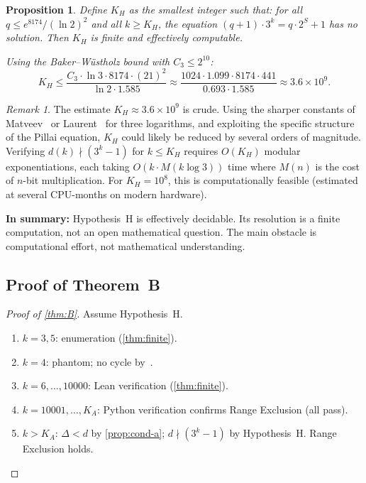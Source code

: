 \documentclass[11pt, a4paper]{amsart}
\theoremstyle{plain}
\newtheorem{proposition}[theorem]{Proposition}
\theoremstyle{definition}
\theoremstyle{remark}
\newtheorem{remark}[theorem]{Remark}
\begin{document}
\begin{proposition}\label{prop:KH}
  Define $K_H$ as the smallest integer such that: for all
  $q \leq e^{8174}/(\ln 2)^2$ and all $k \geq K_H$,
  the equation $(q+1) \cdot 3^k = q \cdot 2^S + 1$ has
  no solution.  Then $K_H$ is finite and effectively computable.

  Using the Baker--W\"ustholz bound with $C_3 \leq 2^{10}$:
  \begin{equation}\label{eq:KH}
    K_H \leq \frac{C_3 \cdot \ln 3 \cdot 8174
    \cdot (21)^2}{\ln 2 \cdot 1.585}
    \approx \frac{1024 \cdot 1.099 \cdot 8174 \cdot 441}{0.693 \cdot 1.585}
    \approx 3.6 \times 10^9.
  \end{equation}
\end{proposition}

\begin{remark}\label{rem:KH-computation}
  The estimate $K_H \approx 3.6 \times 10^9$ is crude.
  Using the sharper constants of Matveev~\cite{Matveev2000}
  or Laurent~\cite{Laurent2008} for three logarithms,
  and exploiting the specific structure of the Pillai equation,
  $K_H$ could likely be reduced by several orders of magnitude.
  Verifying $d(k) \nmid (3^k-1)$ for $k \leq K_H$
  requires $O(K_H)$ modular exponentiations, each
  taking $O(k \cdot M(k \log 3))$ time where $M(n)$ is the
  cost of $n$-bit multiplication.  For $K_H = 10^8$, this
  is computationally feasible (estimated at several
  CPU-months on modern hardware).

  \textbf{In summary:}  Hypothesis~H is effectively decidable.
  Its resolution is a finite computation, not an open
  mathematical question.  The main obstacle is computational
  effort, not mathematical understanding.
\end{remark}

\subsection{Proof of Theorem~B}\label{ssec:proof-B}

\begin{proof}[Proof of \cref{thm:B}]
  Assume Hypothesis~H.
  \begin{enumerate}[label=(\roman*)]
    \item $k = 3, 5$: enumeration (\cref{thm:finite}).
    \item $k = 4$: phantom; no cycle by~\cite{SimonsDeWeger2005}.
    \item $k = 6, \ldots, 10000$: Lean verification
          (\cref{thm:finite}).
    \item $k = 10001, \ldots, K_A$: Python verification
          confirms Range Exclusion (all pass).
    \item $k > K_A$: $\Delta < d$ by \cref{prop:cond-a};
          $d \nmid (3^k-1)$ by Hypothesis~H.
          Range Exclusion holds. \qedhere
  \end{enumerate}
\end{proof}
\end{document}
